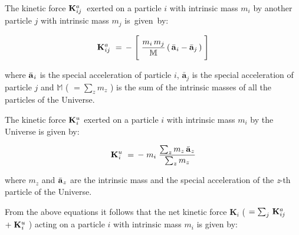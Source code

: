 \documentclass[10pt,fleqn]{article}
\begin{document}
\noindent The kinetic force \hbox {$\mathbf{K}^{a}_{\hspace{+0.012em}ij}$ exerted} on a particle $i$ with intrinsic mass $m_i$ by another particle $j$ with intrinsic mass $m_j$ \hbox {is given by}:
\par \vspace{-0.54em}
\begin{eqnarray*}
\mathbf{K}^{a}_{\hspace{+0.012em}ij} ~=\, - \; \Bigg [ \; \dfrac{m_i \, m_j}{\mathbb{M}} \, ( \, \bar{\mathbf{a}}_{\hspace{+0.045em}i} - \bar{\mathbf{a}}_{j} \, ) \; \Bigg ]
\end{eqnarray*}
\par \vspace{+0.60em}
\noindent where $\bar{\mathbf{a}}_{\hspace{+0.045em}i}$ is the special acceleration of particle $i$, $\bar{\mathbf{a}}_{j}$ is the special acceleration of particle $j$ and $\mathbb{M}$ {\small ( $ = \sum_z m_z$ )} is the sum of the intrinsic masses of all the particles of the Universe.
\par \vspace{+0.60em}
\noindent The kinetic force $\mathbf{K}^{u}_{\hspace{+0.030em}i}$ exerted on a particle $i$ with intrinsic mass $m_i$ by the Universe is given by:
\par \vspace{-0.45em}
\begin{eqnarray*}
\mathbf{K}^{u}_{\hspace{+0.030em}i} ~=\, - \; m_i \; \dfrac{\sum_z m_z \, \bar{\mathbf{a}}_{\hspace{+0.045em}z}}{\sum_z m_z}
\end{eqnarray*}
\par \vspace{+0.60em}
\noindent where $m_z$ and $\bar{\mathbf{a}}_{\hspace{+0.045em}z}$ are the intrinsic mass and the special acceleration of the \textit{z}-th particle of the Universe.
\par \vspace{+0.60em}
\noindent From the above equations it follows that the net kinetic force $\mathbf{K}_i$ {\small ( $ = \sum_j \, \mathbf{K}^{a}_{\hspace{+0.012em}ij}$ $+ \; \mathbf{K}^{u}_{\hspace{+0.030em}i}$ )} acting on a particle $i$ with intrinsic mass $m_i$ is given by:
\par \vspace{-0.60em}
\end{document}

